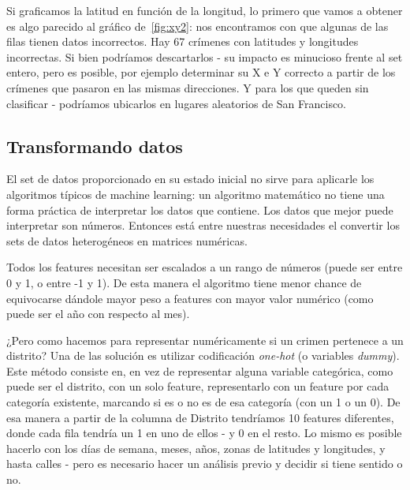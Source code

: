 Si graficamos la latitud en función de la longitud, lo primero que vamos a obtener es algo parecido al gráfico de~\ref{fig:xy2}: nos encontramos con que algunas de las filas tienen datos incorrectos. Hay 67 crímenes con latitudes y longitudes incorrectas. Si bien podríamos descartarlos - su impacto es minucioso frente al set entero, pero es posible, por ejemplo determinar su X e Y correcto a partir de los crímenes que pasaron en las mismas direcciones. Y para los que queden sin clasificar - podríamos ubicarlos en lugares aleatorios de San Francisco.



\subsection{Transformando datos} %
\label{sub:transformando_datos}

El set de datos proporcionado en su estado inicial no sirve para aplicarle los algoritmos típicos de machine learning: un algoritmo matemático no tiene una forma práctica de interpretar los datos que contiene. Los datos que mejor puede interpretar son números. Entonces está entre nuestras necesidades el convertir los sets de datos heterogéneos en matrices numéricas.

Todos los features necesitan ser escalados a un rango de números (puede ser entre 0 y 1, o entre -1 y 1). De esta manera el algoritmo tiene menor chance de equivocarse dándole mayor peso a features con mayor valor numérico (como puede ser el año con respecto al mes).

¿Pero como hacemos para representar numéricamente si un crimen pertenece a un distrito? Una de las solución es utilizar codificación \textit{one-hot} (o variables \textit{dummy}). Este método consiste en, en vez de representar alguna variable categórica, como puede ser el distrito, con un solo feature, representarlo con un feature por cada categoría existente, marcando si es o no es de esa categoría (con un 1 o un 0). De esa manera a partir de la columna de Distrito tendríamos 10 features diferentes, donde cada fila tendría un 1 en uno de ellos - y 0 en el resto. Lo mismo es posible hacerlo con los días de semana, meses, años, zonas de latitudes y longitudes, y hasta calles - pero es necesario hacer un análisis previo y decidir si tiene sentido o no.


